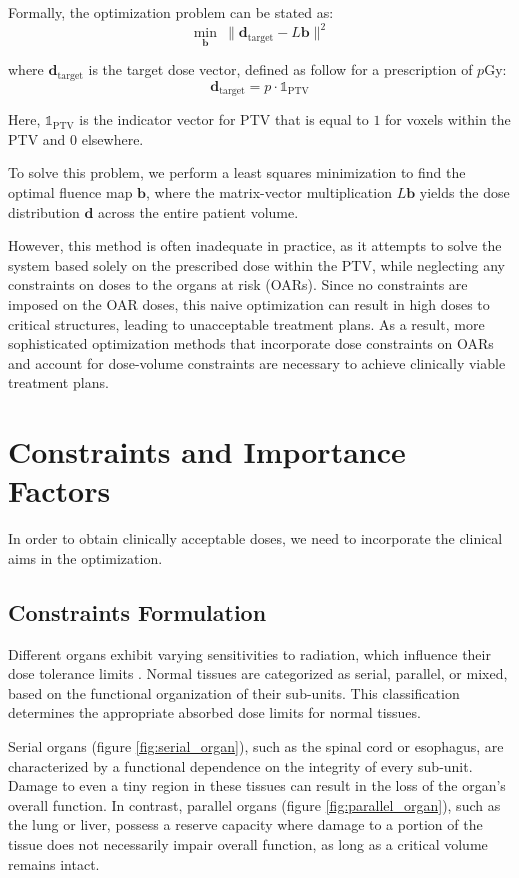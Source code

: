 Formally, the optimization problem can be stated as:
$$ \min_\mathbf{b} \ \| \mathbf{d}_{\text{target}} - L\mathbf{b} \|^2 $$

where $\mathbf{d}_{\text{target}}$ is the target dose vector, defined as follow for a prescription of $p$Gy:
$$ \mathbf{d}_{\text{target}} = p \cdot  \mathds{1}_{\text{PTV}} $$

Here, $\mathds{1}_{\text{PTV}}$ is the indicator vector for PTV that is equal to $1$ for voxels within the PTV and $0$ elsewhere.

To solve this problem, we perform a least squares minimization to find the optimal fluence map $\mathbf{b}$, where the matrix-vector multiplication $L\mathbf{b}$ yields the dose distribution $\mathbf{d}$ across the entire patient volume.

However, this method is often inadequate in practice, as it attempts to solve the system based solely on the prescribed dose within the PTV, while neglecting any constraints on doses to the organs at risk (OARs).
Since no constraints are imposed on the OAR doses, this naive optimization can result in high doses to critical structures, leading to unacceptable treatment plans.
As a result, more sophisticated optimization methods that incorporate dose constraints on OARs and account for dose-volume constraints are necessary to achieve clinically viable treatment plans.

\section{Constraints and Importance Factors}
In order to obtain clinically acceptable doses, we need to incorporate the clinical aims in the optimization.

\subsection{Constraints Formulation}
Different organs exhibit varying sensitivities to radiation, which influence their dose tolerance limits \cite{Withers1988} \cite{ICRU83}.
Normal tissues are categorized as serial, parallel, or mixed, based on the functional organization of their sub-units.
This classification determines the appropriate absorbed dose limits for normal tissues.

Serial organs (figure \ref{fig:serial_organ}), such as the spinal cord or esophagus, are characterized by a functional dependence on the integrity of every sub-unit.
Damage to even a tiny region in these tissues can result in the loss of the organ's overall function.
In contrast, parallel organs (figure \ref{fig:parallel_organ}), such as the lung or liver, possess a reserve capacity where damage to a portion of the tissue does not necessarily impair overall function, as long as a critical volume remains intact.

